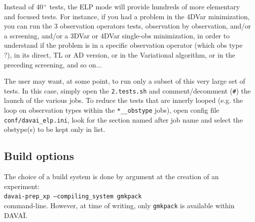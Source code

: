 \documentclass[a4paper,10pt,twoside]{article}
\begin{document}
\noindent Instead of 40$^+$ tests, the ELP mode will provide hundreds of more elementary and focused tests. For instance, if you had a problem in the 4DVar minimization, you can run the 3 observation operators tests, observation by observation, and/or a screening, and/or a 3DVar or 4DVar single-obs minimization, in order to understand if the problem is in a specific observation operator (which obs type ?), in its direct, TL or AD version, or in the Variational algorithm, or in the preceding screening, and so on...

The user may want, at some point, to run only a subset of this very large set of tests. In this case, simply open the \texttt{2.tests.sh} and comment/decomment (\texttt{\#}) the launch of the various jobs.
To reduce the tests that are innerly looped (e.g. the loop on observation types within the \texttt{*\_\_obstype} jobs), open config file \texttt{conf/davai\_elp.ini}, look for the section named after job name and select the obstype(s) to be kept only in list.


\subsection{Build options}
The choice of a build system is done by argument at the creation of an experiment:\\
\texttt{davai-prep\_xp --compiling\_system gmkpack}\\
command-line. However, at time of writing, only \texttt{gmkpack} is available within DAVAÏ.
\end{document}
